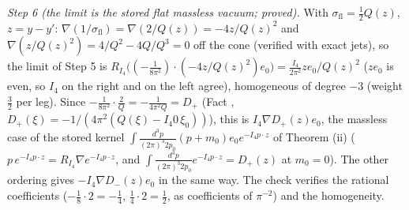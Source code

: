 \emph{Step 6 (the limit is the stored flat massless vacuum; proved).} With $\sigma_{\mathrm{fl}} = \tfrac12 Q(z)$, $z = y - y'$: $\nabla(1/\sigma_{\mathrm{fl}}) = \nabla(2/Q(z)) = -4z/Q(z)^{2}$ and $\nabla(z/Q(z)^{2}) = 4/Q^{2} - 4Q/Q^{3} = 0$ off the cone (verified with exact jets), so the limit of Step 5 is $R_{I_{4}}\bigl((-\tfrac{1}{8\pi^{2}})\cdot(-4z/Q(z)^{2})e_{0}\bigr) = \tfrac{I_{4}}{2\pi^{2}}z e_{0}/Q(z)^{2}$ ($ze_{0}$ is even, so $I_{4}$ on the right and on the left agree), homogeneous of degree $-3$ (weight $\tfrac32$ per leg). Since $-\tfrac{1}{8\pi^{2}}\cdot\tfrac{2}{Q} = -\tfrac{1}{4\pi^{2}Q} = D_{+}$ (Fact , $D_{+}(\xi) = -1/(4\pi^{2}(Q(\xi) - I_{4}0\,\xi_{0}))$), this is $I_{4}\nabla D_{+}(z)e_{0}$, the massless case of the stored kernel $\int\frac{d^{3}p}{(2\pi)^{3}2p_{0}}(p + m_{0})e_{0}e^{-I_{4}p\cdot z}$ of Theorem (ii) ($p\,e^{-I_{4}p\cdot z} = R_{I_{4}}\nabla e^{-I_{4}p\cdot z}$, and $\int\frac{d^{3}p}{(2\pi)^{3}2p_{0}}e^{-I_{4}p\cdot z} = D_{+}(z)$ at $m_{0} = 0$). The other ordering gives $-I_{4}\nabla D_{-}(z)e_{0}$ in the same way. The check verifies the rational coefficients ($-\tfrac18\cdot 2 = -\tfrac14$, $\tfrac14\cdot 2 = \tfrac12$, as coefficients of $\pi^{-2}$) and the homogeneity.

